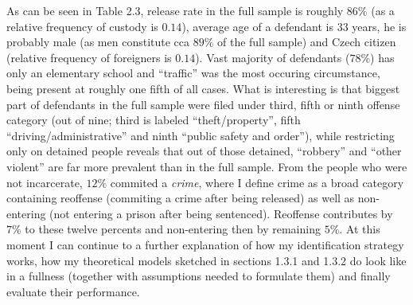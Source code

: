 \documentclass[12pt, twoside]{book} %
\begin{document}
As can be seen in Table 2.3, release rate in the full sample is roughly $86\%$ (as a relative frequency of custody is $0.14$), average age of a defendant is $33$ years, he is probably male (as men constitute cca $89$\% of the full sample) and Czech citizen (relative frequency of foreigners is $0.14$). Vast majority of defendants ($78\%$) has only an elementary school and “traffic” was the most occuring circumstance, being present at roughly one fifth of all cases. What is interesting is that biggest part of defendants in the full sample were filed under third, fifth or ninth offense category (out of nine; third is labeled “theft/property”, fifth “driving/administrative” and ninth “public safety and order”), while restricting only on detained people reveals that out of those detained, “robbery” and “other violent” are far more prevalent than in the full sample.\newline
From the people who were not incarcerate, $12\%$ commited a \textit{crime}, where I define crime as a broad category containing reoffense (commiting a crime after being released) as well as non-entering (not entering a prison after being sentenced). Reoffense contributes by $7\%$ to these twelve percents and non-entering then by remaining $5\%$. \newline
At this moment I can continue to a further explanation of how my identification strategy works, how my theoretical models sketched in sections 1.3.1 and 1.3.2 do look like in a fullness (together with assumptions needed to formulate them) and finally evaluate their performance.
\end{document}
